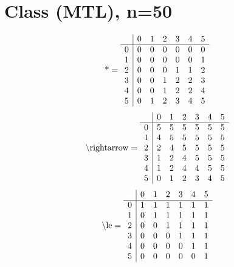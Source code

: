 \documentclass[11pt]{article}
\begin{document}
\section{Class (MTL), n=50}
\[\text{*} = 
\begin{array}{r | r r r r r r}
 & 0 & 1 & 2 & 3 & 4 & 5 \\ \hline
0 & 0 & 0 & 0 & 0 & 0 & 0 \\
1 & 0 & 0 & 0 & 0 & 0 & 1 \\
2 & 0 & 0 & 0 & 1 & 1 & 2 \\
3 & 0 & 0 & 1 & 2 & 2 & 3 \\
4 & 0 & 0 & 1 & 2 & 2 & 4 \\
5 & 0 & 1 & 2 & 3 & 4 & 5 \\
\end{array}
\]
\[\text{\textbackslash rightarrow} = 
\begin{array}{r | r r r r r r}
 & 0 & 1 & 2 & 3 & 4 & 5 \\ \hline
0 & 5 & 5 & 5 & 5 & 5 & 5 \\
1 & 4 & 5 & 5 & 5 & 5 & 5 \\
2 & 2 & 4 & 5 & 5 & 5 & 5 \\
3 & 1 & 2 & 4 & 5 & 5 & 5 \\
4 & 1 & 2 & 4 & 4 & 5 & 5 \\
5 & 0 & 1 & 2 & 3 & 4 & 5 \\
\end{array}
\]
\[\text{\textbackslash le} = 
\begin{array}{r | r r r r r r}
 & 0 & 1 & 2 & 3 & 4 & 5 \\ \hline
0 & 1 & 1 & 1 & 1 & 1 & 1 \\
1 & 0 & 1 & 1 & 1 & 1 & 1 \\
2 & 0 & 0 & 1 & 1 & 1 & 1 \\
3 & 0 & 0 & 0 & 1 & 1 & 1 \\
4 & 0 & 0 & 0 & 0 & 1 & 1 \\
5 & 0 & 0 & 0 & 0 & 0 & 1 \\
\end{array}
\]
\end{document}
